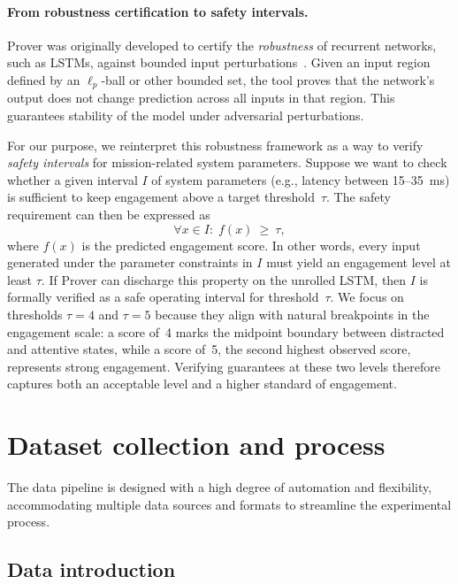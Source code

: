 \documentclass[review]{vgtc}                 %
\newif\ifprintcomments
\newcommand{\peng}[1]{
    \ifprintcomments
        \textcolor{red}{[\textbf{Peng:} #1]}
    \fi}
\begin{document}
\paragraph{From robustness certification to safety intervals.}
Prover was originally developed to certify the \emph{robustness} of recurrent networks, such as LSTMs, against bounded input perturbations~\cite{prover}. Given an input region defined by an $\ell_p$-ball or other bounded set, the tool proves that the network’s output does not change prediction across all inputs
in that region. This guarantees stability of the model under adversarial perturbations.

For our purpose, we reinterpret this robustness framework as a way to verify \emph{safety intervals} for mission-related system parameters. Suppose we want to check whether a given interval \(I\) of system parameters
(e.g., latency between 15--35~ms) is sufficient to keep engagement
above a target threshold~\(\tau\). The safety requirement can then be expressed as
\[
\forall x \in I:\; f(x)\ \ge\ \tau,
\]
where \(f(x)\) is the predicted engagement score. In other words, every input generated under the parameter constraints in \(I\) must yield an engagement level at least \(\tau\).
If Prover can discharge this property on the unrolled LSTM, then \(I\) is formally verified as a safe
operating interval for threshold~\(\tau\). We focus on thresholds \(\tau=4\) and \(\tau=5\) because they align with natural breakpoints in the engagement scale: a score of~4 marks the midpoint boundary between distracted and attentive states, while a score of~5, the second highest observed score, represents strong engagement. Verifying guarantees at these two levels therefore captures both an acceptable level and a higher standard of engagement.



\section{Dataset collection and process}
The data pipeline is designed with a high degree of automation and flexibility, accommodating multiple data sources and formats to streamline the experimental process.

\subsection{Data introduction}

\end{document}
